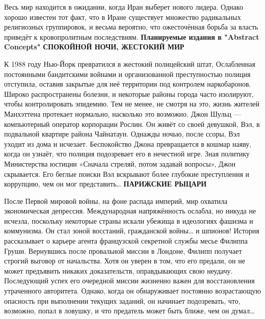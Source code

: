 \documentclass[a4paper,12pt]{book}
\begin{document}
\par
Весь мир находится в ожидании, когда Иран выберет нового лидера. Однако хорошо известен тот факт, что в Иране существует множество радикальных религиозных группировок, и весьма вероятно, что ожесточённая борьба за власть приведёт к кровопролитным последствиям.
\newpage
{}
\noindent
\textbf{Планируемые издания в "Abstract Concepts"}
\newline
\newline
\newline
\newline
\textbf{СПОКОЙНОЙ НОЧИ, ЖЕСТОКИЙ МИР}\\
\par
К 1988 году Нью-Йорк превратился в жестокий полицейский штат, Ослабленная постоянными бандитскими войнами и организованной преступностью полиция отступила, оставив закрытые для неё территории под контролем наркобаронов. Широко распространены болезни, и некоторые районы города часто изолируют, чтобы контролировать эпидемию. Тем не менее, не смотря на это, жизнь жителей Манхэттена протекает нормально, насколько это возможно.
Джон Шульц — компьютерный оператор корпорации Рослин. Он живёт со своей девушкой, Вэл, в подвальной квартире района Чайнатаун.
Однажды ночью, после ссоры, Вэл уходит из дома и исчезает. Беспокойство Джона превращается в кошмар наяву, когда он узнаёт, что полиция подозревает его в нечестной игре. Зная политику Министерства юстиции «Сначала стреляй, потом задавай вопросы», Джон скрывается.
Его беглые поиски Вэл вскрывают более глубокие преступления и коррупцию, чем он мог представить…
\newline
\newline
\newline
\textbf{ПАРИЖСКИЕ РЫЦАРИ}\\
\par
После Первой мировой войны, на фоне распада империй, мир охватила экономическая депрессия. Международная напряжённость ослабла, но никуда не исчезла, поскольку некоторые страны искали убежища в идеологиях фашизма и коммунизма.
Он стал зоной восстаний, гражданской войны… и шпионов!
История рассказывает о карьере агента французской секретной службы месье Филиппа Груши. Вернувшись после провальной миссии в Лондоне, Филипп получает строгий выговор от начальства. Хотя он уверен в том, что его предали, он не может предъявить никаких доказательств, оправдывающих свою неудачу. Последующий успех его очередной миссии жизненно важен для восстановления утраченного авторитета. Однако, когда он обнаруживает постоянно возрастающую опасность при выполнении текущих заданий, он начинает подозревать, что, возможно, попал в ловушку, и что предатель может быть ближе, чем он думал…
\end{document}
